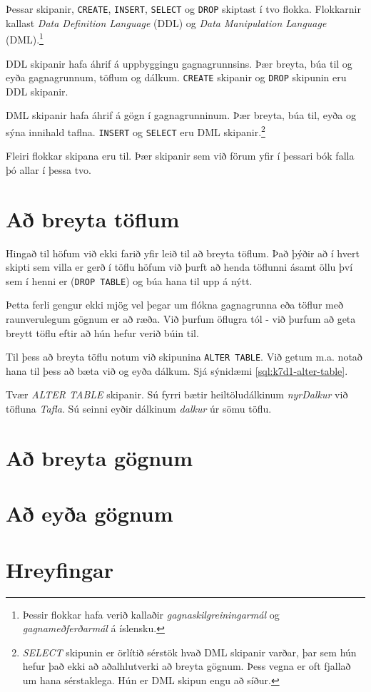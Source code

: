 Þessar skipanir, \verb|CREATE|, \verb|INSERT|, \verb|SELECT| og \verb|DROP| skiptast í tvo flokka. Flokkarnir kallast \emph{Data Definition Language} (DDL) og \emph{Data Manipulation Language} (DML).\footnote{Þessir flokkar hafa verið kallaðir \emph{gagnaskilgreiningarmál} og \emph{gagnameðferðarmál} á íslensku.}

DDL skipanir hafa áhrif á uppbyggingu gagnagrunnsins. Þær breyta, búa til og eyða gagnagrunnum, töflum og dálkum. \verb|CREATE| skipanir og \verb|DROP| skipunin eru DDL skipanir.

DML skipanir hafa áhrif á gögn í gagnagrunninum. Þær breyta, búa til, eyða og sýna innihald taflna. \verb|INSERT| og \verb|SELECT| eru DML skipanir.\footnote{\emph{SELECT} skipunin er örlítið sérstök hvað DML skipanir varðar, þar sem hún hefur það ekki að aðalhlutverki að breyta gögnum. Þess vegna er oft fjallað um hana sérstaklega. Hún er DML skipun engu að síður.}

Fleiri flokkar skipana eru til. Þær skipanir sem við förum yfir í þessari bók falla þó allar í þessa tvo.
\section{Að breyta töflum}
Hingað til höfum við ekki farið yfir leið til að breyta töflum. Það þýðir að í hvert skipti sem villa er gerð í töflu höfum við þurft að henda töflunni ásamt öllu því sem í henni er (\verb|DROP TABLE|) og búa hana til upp á nýtt.

Þetta ferli gengur ekki mjög vel þegar um flókna gagnagrunna eða töflur með raunverulegum gögnum er að ræða. Við þurfum öflugra tól - við þurfum að geta breytt töflu eftir að hún hefur verið búin til.

Til þess að breyta töflu notum við skipunina \verb|ALTER TABLE|. Við getum m.a. notað hana til þess að bæta við og eyða dálkum. Sjá sýnidæmi \ref{sql:k7d1-alter-table}.

\begin{example}
\caption[ALTER TABLE]{Tvær \emph{ALTER TABLE} skipanir. Sú fyrri bætir heiltöludálkinum \emph{nyrDalkur} við töfluna \emph{Tafla}. Sú seinni eyðir dálkinum \emph{dalkur} úr sömu töflu.}
\label{sql:k7d1-alter-table}
\centering
{}
\end{example}

\section{Að breyta gögnum}
\section{Að eyða gögnum}
\section{Hreyfingar} %